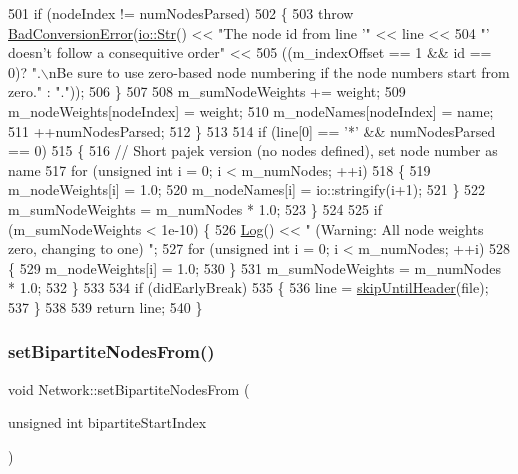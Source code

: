 \begin{DoxyCode}
501         \textcolor{keywordflow}{if} (nodeIndex != numNodesParsed)
502         \{
503             \textcolor{keywordflow}{throw} \mbox{\hyperlink{classBadConversionError}{BadConversionError}}(\mbox{\hyperlink{classio_1_1Str}{io::Str}}() << \textcolor{stringliteral}{"The node id from line '"} << 
      line <<
504                 \textcolor{stringliteral}{"' doesn't follow a consequitive order"} <<
505                 ((m\_indexOffset == 1 && \textcolor{keywordtype}{id} == 0)? \textcolor{stringliteral}{".\(\backslash\)nBe sure to use zero-based node numbering if the node
       numbers start from zero."} : \textcolor{stringliteral}{"."}));
506         \}
507 
508         m\_sumNodeWeights += weight;
509         m\_nodeWeights[nodeIndex] = weight;
510         m\_nodeNames[nodeIndex] = name;
511         ++numNodesParsed;
512     \}
513 
514     \textcolor{keywordflow}{if} (line[0] == \textcolor{charliteral}{'*'} && numNodesParsed == 0)
515     \{
516         \textcolor{comment}{// Short pajek version (no nodes defined), set node number as name}
517         \textcolor{keywordflow}{for} (\textcolor{keywordtype}{unsigned} \textcolor{keywordtype}{int} i = 0; i < m\_numNodes; ++i)
518         \{
519             m\_nodeWeights[i] = 1.0;
520             m\_nodeNames[i] = io::stringify(i+1);
521         \}
522         m\_sumNodeWeights = m\_numNodes * 1.0;
523     \}
524     
525     \textcolor{keywordflow}{if} (m\_sumNodeWeights < 1e-10) \{
526         \mbox{\hyperlink{classLog}{Log}}() << \textcolor{stringliteral}{" (Warning: All node weights zero, changing to one) "};
527         \textcolor{keywordflow}{for} (\textcolor{keywordtype}{unsigned} \textcolor{keywordtype}{int} i = 0; i < m\_numNodes; ++i)
528         \{
529             m\_nodeWeights[i] = 1.0;
530         \}
531         m\_sumNodeWeights = m\_numNodes * 1.0;
532     \}
533 
534     \textcolor{keywordflow}{if} (didEarlyBreak)
535     \{
536         line = \mbox{\hyperlink{classNetwork_afd458fbfc07fc12e8ca3d6ec4e6a7291}{skipUntilHeader}}(file);
537     \}
538 
539     \textcolor{keywordflow}{return} line;
540 \}
\end{DoxyCode}
\mbox{\label{classNetwork_a7ebe3a5e948fc60e81fb94df08ca4358}} 
\subsubsection{\texorpdfstring{set\+Bipartite\+Nodes\+From()}{setBipartiteNodesFrom()}}
{\footnotesize\ttfamily void Network\+::set\+Bipartite\+Nodes\+From (\begin{DoxyParamCaption}\item[{unsigned int}]{bipartite\+Start\+Index }\end{DoxyParamCaption})}

